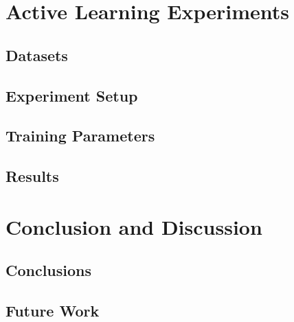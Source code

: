 \section{Active Learning Experiments}

\subsection{Datasets}

\subsection{Experiment Setup}

\subsection{Training Parameters}

\subsection{Results}



\section{Conclusion and Discussion}

\subsection{Conclusions}

\subsection{Future Work}